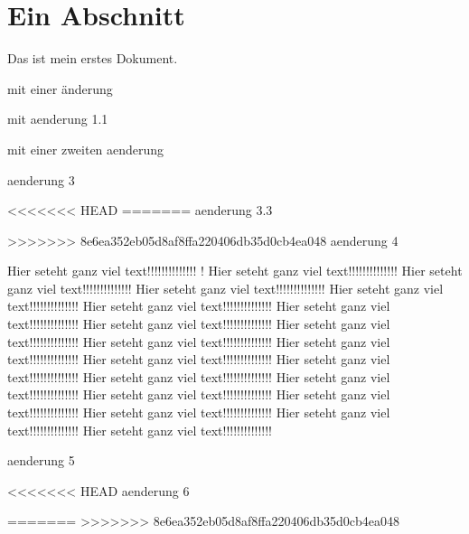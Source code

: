 \documentclass{scrartcl}
\begin{document}
\section{Ein Abschnitt}
Das ist mein erstes Dokument.

mit einer änderung

mit aenderung 1.1

mit einer zweiten aenderung

aenderung 3

<<<<<<< HEAD
=======
aenderung 3.3

>>>>>>> 8e6ea352eb05d8af8ffa220406db35d0cb4ea048
aenderung 4

 Hier seteht ganz viel text!!!!!!!!!!!!!!
! Hier seteht ganz viel text!!!!!!!!!!!!!! Hier seteht ganz viel text!!!!!!!!!!!!!! Hier seteht ganz viel text!!!!!!!!!!!!!! Hier seteht ganz viel text!!!!!!!!!!!!!! Hier seteht ganz viel text!!!!!!!!!!!!!! Hier seteht ganz viel text!!!!!!!!!!!!!! Hier seteht ganz viel text!!!!!!!!!!!!!! Hier seteht ganz viel text!!!!!!!!!!!!!! Hier seteht ganz viel text!!!!!!!!!!!!!! Hier seteht ganz viel text!!!!!!!!!!!!!! Hier seteht ganz viel text!!!!!!!!!!!!!! Hier seteht ganz viel text!!!!!!!!!!!!!! Hier seteht ganz viel text!!!!!!!!!!!!!! Hier seteht ganz viel text!!!!!!!!!!!!!! Hier seteht ganz viel text!!!!!!!!!!!!!! Hier seteht ganz viel text!!!!!!!!!!!!!! Hier seteht ganz viel text!!!!!!!!!!!!!! Hier seteht ganz viel text!!!!!!!!!!!!!! Hier seteht ganz viel text!!!!!!!!!!!!!!


aenderung 5

<<<<<<< HEAD
aenderung 6

=======
>>>>>>> 8e6ea352eb05d8af8ffa220406db35d0cb4ea048
\end{document}
